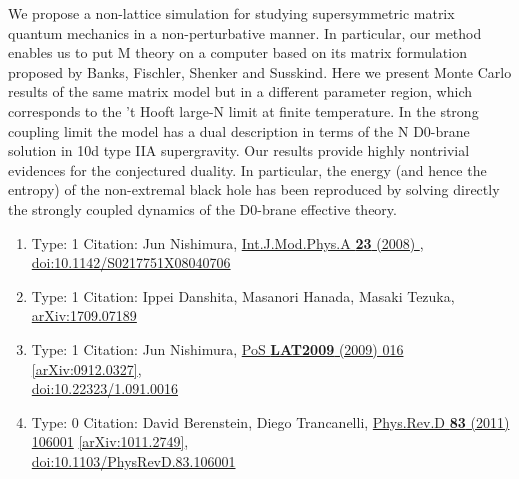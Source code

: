 \documentclass[a4paper,10pt]{article}
\begin{document}
\begin{enumerate}
We propose a non-lattice simulation for studying supersymmetric matrix quantum mechanics in a non-perturbative manner. In particular, our method enables us to put M theory on a computer based on its matrix formulation proposed by Banks, Fischler, Shenker and Susskind. Here we present Monte Carlo results of the same matrix model but in a different parameter region, which corresponds to the 't Hooft large-N limit at finite temperature. In the strong coupling limit the model has a dual description in terms of the N D0-brane solution in 10d type IIA supergravity. Our results provide highly nontrivial evidences for the conjectured duality. In particular, the energy (and hence the entropy) of the non-extremal black hole has been reproduced by solving directly the strongly coupled dynamics of the D0-brane effective theory.
\begin{enumerate}
  \item Type: 1 Citation: Jun Nishimura, \href{https://www.doi.org/10.1142/S0217751X08040706}{Int.J.Mod.Phys.A {\bf 23} (2008) },\\\href{https://www.doi.org/10.1142/S0217751X08040706}{doi:10.1142/S0217751X08040706}
  \item Type: 1 Citation: Ippei Danshita, Masanori Hanada, Masaki Tezuka, \href{https://arxiv.org/abs/1709.07189}{arXiv:1709.07189}
  \item Type: 1 Citation: Jun Nishimura, \href{https://www.doi.org/10.22323/1.091.0016}{PoS {\bf LAT2009} (2009) 016}  \href{https://arxiv.org/abs/0912.0327}{[arXiv:0912.0327]},\\\href{https://www.doi.org/10.22323/1.091.0016}{doi:10.22323/1.091.0016}
  \item Type: 0 Citation: David Berenstein, Diego Trancanelli, \href{https://www.doi.org/10.1103/PhysRevD.83.106001}{Phys.Rev.D {\bf 83} (2011) 106001}  \href{https://arxiv.org/abs/1011.2749}{[arXiv:1011.2749]},\\\href{https://www.doi.org/10.1103/PhysRevD.83.106001}{doi:10.1103/PhysRevD.83.106001}

\end{enumerate}
\end{enumerate}
\end{document}
